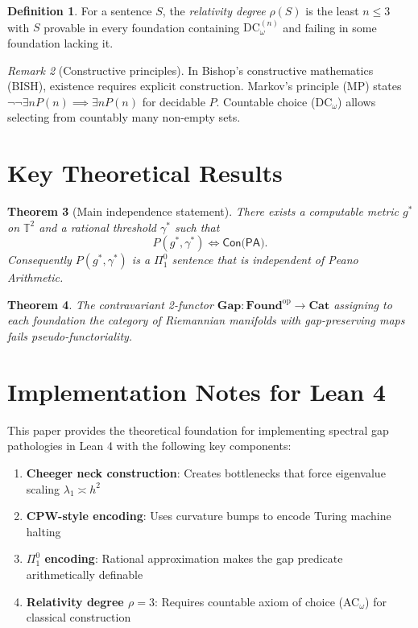 \documentclass[11pt]{article}
\newtheorem{theorem}{Theorem}[section]
\theoremstyle{definition}\newtheorem{definition}[theorem]{Definition}
\theoremstyle{remark}\newtheorem{remark}[theorem]{Remark}
\newcommand{\Found}{\mathbf{Found}}
\newcommand{\Gap}{\mathbf{Gap}}
\newcommand{\DCw}{\mathrm{DC}_{\omega}}
\begin{document}
\begin{definition}
For a sentence $S$, the \emph{relativity degree} $\rho(S)$ is the least $n\le3$ with $S$ provable in every foundation containing $\DCw^{(n)}$ and failing in some foundation lacking it.
\end{definition}

\begin{remark}[Constructive principles]
In Bishop's constructive mathematics (BISH), existence requires explicit construction. Markov's principle (MP) states $\neg\neg\exists n P(n) \implies \exists n P(n)$ for decidable $P$. Countable choice ($\DCw$) allows selecting from countably many non-empty sets.
\end{remark}

\section{Key Theoretical Results}

\begin{theorem}[Main independence statement]\label{thm:gap}
There exists a computable metric $g^\ast$ on $\mathbb T^{2}$ and a
rational threshold $\gamma^\ast$ such that
\[
P(g^\ast,\gamma^\ast) \Longleftrightarrow \textsf{Con(PA)}.
\]
Consequently $P(g^\ast,\gamma^\ast)$ is a $\Pi^0_1$ sentence that is
independent of Peano Arithmetic.
\end{theorem}

\begin{theorem}
The contravariant 2-functor $\Gap:\Found^{\mathrm{op}}\to\mathbf{Cat}$ assigning to each foundation the category of Riemannian manifolds with gap-preserving maps fails pseudo-functoriality.
\end{theorem}

\section{Implementation Notes for Lean 4}

This paper provides the theoretical foundation for implementing spectral gap pathologies in Lean 4 with the following key components:

\begin{enumerate}
\item \textbf{Cheeger neck construction}: Creates bottlenecks that force eigenvalue scaling $\lambda_1 \asymp h^2$
\item \textbf{CPW-style encoding}: Uses curvature bumps to encode Turing machine halting
\item \textbf{$\Pi^0_1$ encoding}: Rational approximation makes the gap predicate arithmetically definable
\item \textbf{Relativity degree $\rho=3$}: Requires countable axiom of choice (AC$_\omega$) for classical construction
\end{enumerate}
\end{document}
